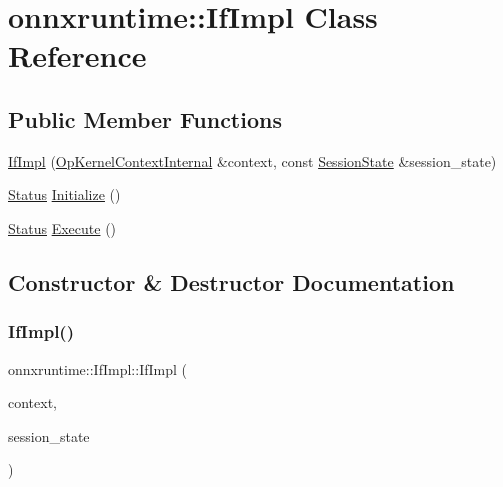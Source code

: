 \hypertarget{classonnxruntime_1_1IfImpl}{}\section{onnxruntime\+:\+:If\+Impl Class Reference}
\label{classonnxruntime_1_1IfImpl}
\subsection*{Public Member Functions}
\begin{DoxyCompactItemize}
\item 
\mbox{\hyperlink{classonnxruntime_1_1IfImpl_a8ed37ef8fe1c14b091bf1373a70491ad}{If\+Impl}} (\mbox{\hyperlink{classonnxruntime_1_1OpKernelContextInternal}{Op\+Kernel\+Context\+Internal}} \&context, const \mbox{\hyperlink{classonnxruntime_1_1SessionState}{Session\+State}} \&session\+\_\+state)
\item 
\mbox{\hyperlink{classonnxruntime_1_1common_1_1Status}{Status}} \mbox{\hyperlink{classonnxruntime_1_1IfImpl_a3a858a2f1e7fc3f31736e4ea28b6ff1b}{Initialize}} ()
\item 
\mbox{\hyperlink{classonnxruntime_1_1common_1_1Status}{Status}} \mbox{\hyperlink{classonnxruntime_1_1IfImpl_a19b44e7ea93c10b171322f29adec8df3}{Execute}} ()
\end{DoxyCompactItemize}


\subsection{Constructor \& Destructor Documentation}
\mbox{\label{classonnxruntime_1_1IfImpl_a8ed37ef8fe1c14b091bf1373a70491ad}} 
\subsubsection{\texorpdfstring{If\+Impl()}{IfImpl()}}
{\footnotesize\ttfamily onnxruntime\+::\+If\+Impl\+::\+If\+Impl (\begin{DoxyParamCaption}\item[{\mbox{\hyperlink{classonnxruntime_1_1OpKernelContextInternal}{Op\+Kernel\+Context\+Internal}} \&}]{context,  }\item[{const \mbox{\hyperlink{classonnxruntime_1_1SessionState}{Session\+State}} \&}]{session\+\_\+state }\end{DoxyParamCaption})}



